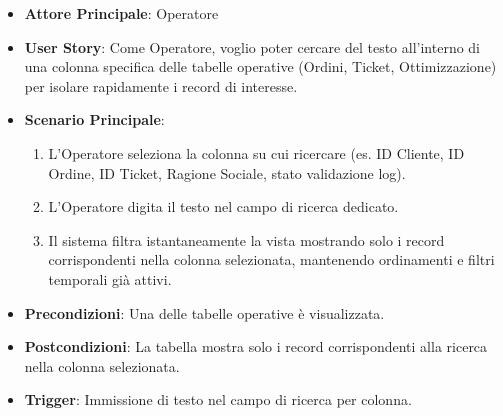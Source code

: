     \begin{itemize}
        \item \textbf{Attore Principale}: Operatore
        \item \textbf{User Story}: Come Operatore, voglio poter cercare del testo all'interno di una colonna specifica delle tabelle operative (Ordini, Ticket, Ottimizzazione) per isolare rapidamente i record di interesse.
        \item \textbf{Scenario Principale}:
        \begin{enumerate}
            \item L'Operatore seleziona la colonna su cui ricercare (es. ID Cliente, ID Ordine, ID Ticket, Ragione Sociale, stato validazione log).
            \item L'Operatore digita il testo nel campo di ricerca dedicato.
            \item Il sistema filtra istantaneamente la vista mostrando solo i record corrispondenti nella colonna selezionata, mantenendo ordinamenti e filtri temporali già attivi.
        \end{enumerate}
        \item \textbf{Precondizioni}: Una delle tabelle operative è visualizzata.
        \item \textbf{Postcondizioni}: La tabella mostra solo i record corrispondenti alla ricerca nella colonna selezionata.
        \item \textbf{Trigger}: Immissione di testo nel campo di ricerca per colonna.
    \end{itemize}